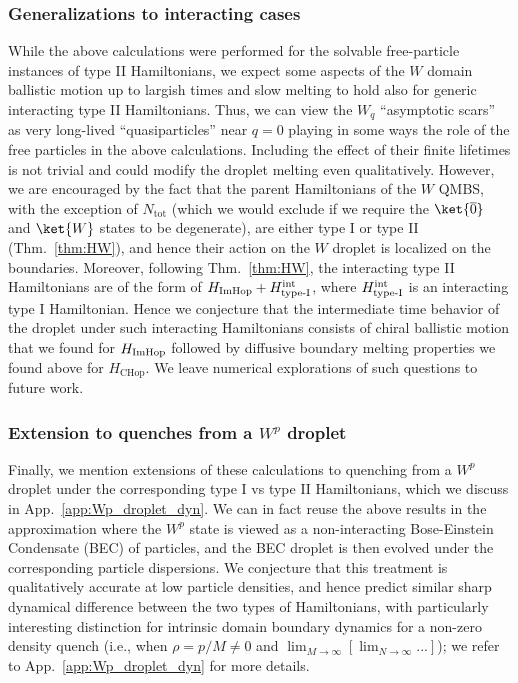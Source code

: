 \documentclass[prx,letterpaper,aps,superscriptaddress,floatfix,twocolumn,nofootinbib]{revtex4-2}
\theoremstyle{definition}
\newcommand{\ktO}{\ket{\overline{0}}}
\newcommand{\ktW}{\ket{W}}
\begin{document}
\subsubsection{Generalizations to interacting cases}
%
While the above calculations were performed for the solvable free-particle instances of type II Hamiltonians, we expect some aspects of the $W$ domain ballistic motion up to largish times and slow melting to hold also for generic interacting type II Hamiltonians. 
%
Thus, we can view the $W_q$ ``asymptotic scars'' as very long-lived ``quasiparticles'' near $q=0$ playing in some ways the role of the free particles in the above calculations.
%
Including the effect of their finite lifetimes is not trivial and could modify the droplet melting even qualitatively.
%
However, we are encouraged by the fact that the parent Hamiltonians of the $W$ QMBS, with the exception of $N_{\text{tot}}$ (which we would exclude if we require the $\ktO$ and $\ktW$ states to be degenerate), are either type I or type II (Thm.~\ref{thm:HW}), and hence their action on the $W$ droplet is localized on the boundaries.
%
Moreover, following Thm.~\ref{thm:HW}, the interacting type II Hamiltonians are of the form of $H_{\rm ImHop} + H^{\rm int}_{\text{type-I}}$, where $H^{\rm int}_{\text{type-I}}$ is an interacting type I Hamiltonian.
%
Hence we conjecture that the intermediate time behavior of the droplet under such interacting Hamiltonians consists of chiral ballistic motion that we found for $H_{\rm ImHop}$ followed by diffusive boundary melting properties we found above for $H_{\text{CHop}}$.
%
We leave numerical explorations of such questions to future work.
%
\subsubsection{Extension to quenches from a $W^p$ droplet}
%
Finally, we mention extensions of these calculations to quenching from a $W^p$ droplet under the corresponding type I vs type II Hamiltonians, which we discuss in App.~\ref{app:Wp_droplet_dyn}.
%
We can in fact reuse the above results in the approximation where the $W^p$ state is viewed as a non-interacting Bose-Einstein Condensate (BEC) of particles, and the BEC droplet is then evolved under the corresponding particle dispersions.
%
We conjecture that this treatment is qualitatively accurate at low particle densities, and hence predict similar sharp dynamical difference between the two types of Hamiltonians, with particularly interesting distinction for intrinsic domain boundary dynamics for a non-zero density quench (i.e., when $\rho = p/M \neq 0$ and $\lim_{M\to \infty}[\lim_{N \to \infty}...]$); we refer to App.~\ref{app:Wp_droplet_dyn} for more details.
\end{document}
